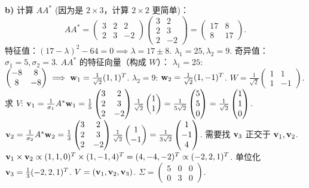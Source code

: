 \begin{exer}
\textbf{b)}
计算 $AA^*$ (因为是 $2 \times 3$，计算 $2 \times 2$ 更简单)：
$$ AA^* = \begin{pmatrix} 3 & 2 & 2 \\ 2 & 3 & -2 \end{pmatrix} \begin{pmatrix} 3 & 2 \\ 2 & 3 \\ 2 & -2 \end{pmatrix} = \begin{pmatrix} 17 & 8 \\ 8 & 17 \end{pmatrix}. $$
特征值：$(17-\lambda)^2 - 64 = 0 \implies \lambda = 17 \pm 8$. $\lambda_1 = 25, \lambda_2 = 9$.
奇异值：$\sigma_1 = 5, \sigma_2 = 3$.
$AA^*$ 的特征向量（构成 $W$）：
$\lambda_1 = 25$: $\begin{pmatrix} -8 & 8 \\ 8 & -8 \end{pmatrix} \implies \mathbf{w}_1 = \frac{1}{\sqrt{2}}(1, 1)^T$.
$\lambda_2 = 9$: $\mathbf{w}_2 = \frac{1}{\sqrt{2}}(1, -1)^T$.
$W = \frac{1}{\sqrt{2}} \begin{pmatrix} 1 & 1 \\ 1 & -1 \end{pmatrix}$.
\\
求 $V$:
$\mathbf{v}_1 = \frac{1}{\sigma_1} A^* \mathbf{w}_1 = \frac{1}{5} \begin{pmatrix} 3 & 2 \\ 2 & 3 \\ 2 & -2 \end{pmatrix} \frac{1}{\sqrt{2}} \begin{pmatrix} 1 \\ 1 \end{pmatrix} = \frac{1}{5\sqrt{2}} \begin{pmatrix} 5 \\ 5 \\ 0 \end{pmatrix} = \frac{1}{\sqrt{2}} \begin{pmatrix} 1 \\ 1 \\ 0 \end{pmatrix}$.
$\mathbf{v}_2 = \frac{1}{\sigma_2} A^* \mathbf{w}_2 = \frac{1}{3} \begin{pmatrix} 3 & 2 \\ 2 & 3 \\ 2 & -2 \end{pmatrix} \frac{1}{\sqrt{2}} \begin{pmatrix} 1 \\ -1 \end{pmatrix} = \frac{1}{3\sqrt{2}} \begin{pmatrix} 1 \\ -1 \\ 4 \end{pmatrix}$.
需要找 $\mathbf{v}_3$ 正交于 $\mathbf{v}_1, \mathbf{v}_2$.
$\mathbf{v}_1 \times \mathbf{v}_2 \propto (1, 1, 0)^T \times (1, -1, 4)^T = (4, -4, -2)^T \propto (-2, 2, 1)^T$.
单位化 $\mathbf{v}_3 = \frac{1}{3}(-2, 2, 1)^T$.
$V = (\mathbf{v}_1, \mathbf{v}_2, \mathbf{v}_3)$. $\Sigma = \begin{pmatrix} 5 & 0 & 0 \\ 0 & 3 & 0 \end{pmatrix}$.


\end{exer}
